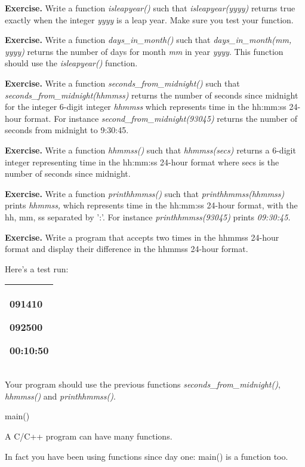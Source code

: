 \documentclass[
]{article}
\begin{document}
\textbf{Exercise.} Write a function \emph{isleapyear()} such that
\emph{isleapyear(yyyy)} returns true exactly when the integer
\emph{yyyy} is a leap year. Make sure you test your function.

\textbf{Exercise. }Write a function \emph{days\_in\_month()} such that
\emph{days\_in\_month(mm, yyyy)} returns the number of days for month
\emph{mm} in year \emph{yyyy}. This function should use the
\emph{isleapyear()} function.

\textbf{Exercise.} Write a function \emph{seconds\_from\_midnight()}
such that \emph{seconds\_from\_midnight(hhmmss)} returns the number of
seconds since midnight for the integer 6-digit integer \emph{hhmmss}
which represents time in the hh:mm:ss 24-hour format. For instance
\emph{second\_from\_midnight(93045)} returns the number of seconds from
midnight to 9:30:45.

\textbf{Exercise.} Write a function \emph{hhmmss()} such that
\emph{hhmmss(secs)} returns a 6-digit integer representing time in the
hh:mm:ss 24-hour format where secs is the number of seconds since
midnight.

\textbf{Exercise.} Write a function \emph{printhhmmss()} such that
\emph{printhhmmss(hhmmss)} prints \emph{hhmmss,} which represents time
in the hh:mm:ss 24-hour format, with the hh, mm, ss separated by ':'.
For instance \emph{printhhmmss(93045)} prints \emph{09:30:45.}

\textbf{Exercise.} Write a program that accepts two times in the hhmmss
24-hour format and display their difference in the hhmmss 24-hour
format.

Here's a test run:

\begin{longtable}[]{@{}l@{}}
\toprule
\endhead
\begin{minipage}[t]{0.97\columnwidth}\raggedright
091410

092500

00:10:50\strut
\end{minipage}\tabularnewline
\bottomrule
\end{longtable}

Your program should use the previous functions
\emph{seconds\_from\_midnight()}, \emph{hhmmss() }and
\emph{printhhmmss()}.

main()

A C/C++ program can have many functions.

In fact you have been using functions since day one: main() is a
function too.
\end{document}
